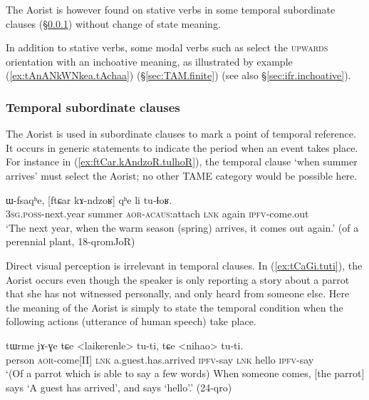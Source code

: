 The Aorist is however found on stative verbs in some temporal subordinate clauses (§\ref{sec:aor.temporal}) without change of state meaning. 

In addition to stative verbs, some modal verbs such as  select the \textsc{upwards} orientation with an inchoative meaning, as illustrated by example (\ref{ex:tAnANkWNkea.tAchaa}) (§\ref{sec:TAM.finite}) (see also §\ref{sec:ifr.inchoative}).
 


\subsubsection{Temporal subordinate clauses }   \label{sec:aor.temporal}
The Aorist is used in subordinate clauses to mark a point of temporal reference. It occurs in generic statements to indicate the period when an event takes place. For instance in  (\ref{ex:ftCar.kAndzoR.tulhoR}), the temporal clause  `when summer arrives' must select the Aorist; no other TAME category would be possible here.

\begin{exe}
\ex \label{ex:ftCar.kAndzoR.tulhoR}
 \gll ɯ-fsaqʰe, [ftɕar kɤ-ndzoʁ] qʰe li tu-ɬoʁ. \\
 \textsc{3sg}.\textsc{poss}-next.year summer \textsc{aor}-\textsc{acaus}:attach \textsc{lnk} again \textsc{ipfv}-come.out \\
 \glt `The next year, when the warm season (spring) arrives, it comes out again.' (of a perennial plant, 18-qromJoR)
\end{exe}

Direct visual perception is irrelevant in temporal clauses. In (\ref{ex:tCaGi.tuti}), the Aorist  occurs even though the speaker is only reporting a story about a parrot that she has not witnessed personally, and only heard from someone else. Here the meaning of the Aorist is simply to state the temporal condition when the following actions (utterance of human speech) take place.

\begin{exe}
\ex \label{ex:tCaGi.tuti}
 \gll tɯrme jɤ-ɣe tɕe <laikerenle> tu-ti, tɕe <nihao>  tu-ti. \\
 person \textsc{aor}-come[II] \textsc{lnk} a.guest.has.arrived \textsc{ipfv}-say \textsc{lnk} hello \textsc{ipfv}-say  \\
 \glt `(Of a parrot which is able to say a few words) When someone comes, [the parrot] says `A guest has arrived', and says `hello'.' (24-qro) 
\end{exe}
 
